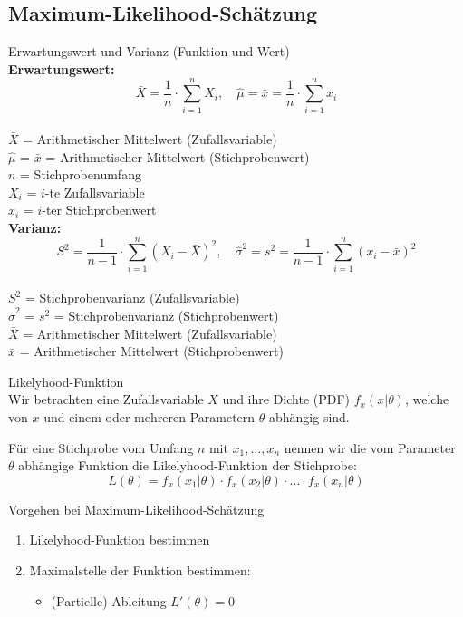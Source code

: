 \subsection{Maximum-Likelihood-Schätzung}

\begin{definition}{Erwartungswert und Varianz (Funktion und Wert)}\\
\textbf{Erwartungswert:}
$$
\bar{X}=\frac{1}{n} \cdot \sum_{i=1}^n X_i, \quad \hat{\mu}=\bar{x}=\frac{1}{n} \cdot \sum_{i=1}^n x_i
$$
\\
$\bar{X}$ = Arithmetischer Mittelwert (Zufallsvariable)\\
$\hat{\mu}$ = $\bar{x}$ = Arithmetischer Mittelwert (Stichprobenwert)\\
$n$ = Stichprobenumfang\\
$X_i$ = $i$-te Zufallsvariable\\
$x_i$ = $i$-ter Stichprobenwert\\

\textbf{Varianz:}
$$
S^2=\frac{1}{n-1} \cdot \sum_{i=1}^n (X_i-\bar{X})^2, \quad \hat{\sigma}^2=s^2=\frac{1}{n-1} \cdot \sum_{i=1}^n (x_i-\bar{x})^2
$$
\\
$S^2$ = Stichprobenvarianz (Zufallsvariable)\\
$\hat{\sigma}^2$ = $s^2$ = Stichprobenvarianz (Stichprobenwert)\\
$\bar{X}$ = Arithmetischer Mittelwert (Zufallsvariable)\\
$\bar{x}$ = Arithmetischer Mittelwert (Stichprobenwert)
\end{definition}

\begin{definition}{Likelyhood-Funktion}\\
Wir betrachten eine Zufallsvariable $X$ und ihre Dichte (PDF) $f_x(x|\theta)$, welche von $x$ und einem oder mehreren Parametern $\theta$ abhängig sind. 

Für eine Stichprobe vom Umfang $n$ mit $x_1,\ldots,x_n$ nennen wir die vom Parameter $\theta$ abhängige Funktion die Likelyhood-Funktion der Stichprobe:
$$
L(\theta)=f_x(x_1|\theta) \cdot f_x(x_2|\theta) \cdot \ldots \cdot f_x(x_n|\theta)
$$
\end{definition}

\begin{concept}{Vorgehen bei Maximum-Likelihood-Schätzung}\\
\begin{enumerate}
  \item Likelyhood-Funktion bestimmen
  \item Maximalstelle der Funktion bestimmen:
        \begin{itemize}
           \item (Partielle) Ableitung $L'(\theta)=0$
        \end{itemize}
\end{enumerate}
\end{concept}


